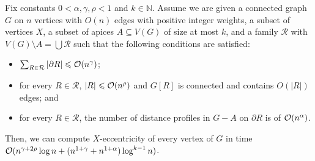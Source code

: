 \begin{lemma}\label{l:main_ecc}
Fix constants $0 < \alpha, \gamma, \rho < 1$ and $k \in \mathbb{N}$. Assume we are given a connected graph $G$ on $n$ vertices with $O(n)$ edges with positive integer weights, a subset of vertices $X$, a subset of apices $A \subseteq V(G)$ of size at most $k$, and a family $\mathcal{R}$ with $V(G) \setminus A = \bigcup \mathcal{R} $ such that the following conditions are satisfied:
\begin{itemize}[nosep]
	\item $\sum_{R \in \mathcal{R}} |\partial R| \leqslant \mathcal{O}(n^\gamma)$;
	\item for every $R \in \mathcal{R}$, $|R| \leqslant \mathcal{O}(n^\rho)$ and $G[R]$ is connected and contains $O(|R|)$ edges; and
	\item for every $R \in \mathcal{R}$, the number of distance profiles in $G-A$ on $\partial R$ is of $\mathcal{O}(n^\alpha)$.
\end{itemize}
Then, we can compute $X$-eccentricity of every vertex of $G$ in time $\mathcal{O}(n^{\gamma + 2\rho} \log n + (n^{1 + \gamma} + n^{1 + \alpha}) \log^{k - 1} n)$.
\end{lemma}

